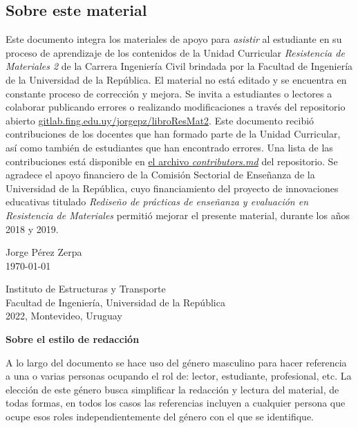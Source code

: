 \subsection*{Sobre este material}

\thispagestyle{empty}

Este documento integra los materiales de apoyo para \textit{asistir} al estudiante en su proceso de aprendizaje de los contenidos de la Unidad Curricular \textit{Resistencia de Materiales 2} de la Carrera Ingeniería Civil brindada por la Facultad de Ingeniería de la Universidad de la República. %
%
El material no está editado y se encuentra en constante proceso de corrección y mejora. Se invita a estudiantes o lectores a colaborar publicando errores o realizando modificaciones a través del repositorio abierto \href{https://gitlab.fing.edu.uy/jorgepz/libroResMat2}{gitlab.fing.edu.uy/jorgepz/libroResMat2}. %
%
Este documento recibió contribuciones de los docentes que han formado parte de la Unidad Curricular, así como también de estudiantes que han encontrado errores. %
Una lista de las contribuciones está disponible en \href{https://gitlab.fing.edu.uy/jorgepz/libroResMat2/-/blob/master/contributors.md}{el archivo \textit{contributors.md}} del repositorio. %
%
Se agradece el apoyo financiero de la Comisión Sectorial de Enseñanza de la Universidad de la República, cuyo financiamiento del proyecto de innovaciones educativas titulado \textit{Rediseño de prácticas de enseñanza y evaluación en Resistencia de Materiales} permitió mejorar el presente material, durante los años 2018 y 2019. %
%
\begin{flushright}
Jorge Pérez Zerpa\\
\today
\end{flushright} 

\vspace{4mm}

\begin{flushleft}
Instituto de Estructuras y Transporte\\
Facultad de Ingeniería, Universidad de la República\\
2022, Montevideo, Uruguay
\end{flushleft} 


\vspace{5mm}


\noindent
\textbf{Sobre el estilo de redacción}

A lo largo del documento se hace uso del género masculino para hacer referencia a una o varias personas ocupando el rol de: lector, estudiante, profesional, etc. La elección de este género busca simplificar la redacción y lectura del material, de todas formas, en todos los casos las referencias incluyen a cualquier persona que ocupe esos roles independientemente del género con el que se identifique.

